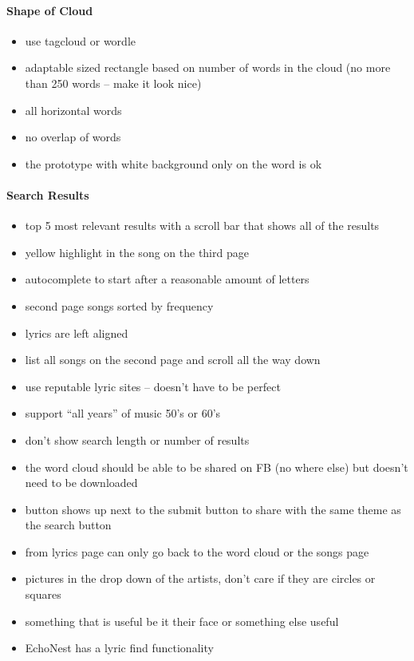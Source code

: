 \documentclass[]{article}
\begin{document}
\paragraph{Shape of Cloud}\label{shape-of-cloud}

\begin{itemize}
\itemsep1pt\parskip0pt
\item
  use tagcloud or wordle
\item
  adaptable sized rectangle based on number of words in the cloud (no
  more than 250 words -- make it look nice)
\item
  all horizontal words
\item
  no overlap of words
\item
  the prototype with white background only on the word is ok
\end{itemize}

\paragraph{Search Results}\label{search-results}

\begin{itemize}
\itemsep1pt\parskip0pt
\item
  top 5 most relevant results with a scroll bar that shows all of the
  results
\item
  yellow highlight in the song on the third page
\item
  autocomplete to start after a reasonable amount of letters
\item
  second page songs sorted by frequency
\item
  lyrics are left aligned
\item
  list all songs on the second page and scroll all the way down
\item
  use reputable lyric sites -- doesn't have to be perfect
\item
  support ``all years'' of music 50's or 60's
\item
  don't show search length or number of results
\item
  the word cloud should be able to be shared on FB (no where else) but
  doesn't need to be downloaded
\item
  button shows up next to the submit button to share with the same theme
  as the search button
\item
  from lyrics page can only go back to the word cloud or the songs page
\item
  pictures in the drop down of the artists, don't care if they are
  circles or squares
\item
  something that is useful be it their face or something else useful
\item
  EchoNest has a lyric find functionality
\end{itemize}
\end{document}
